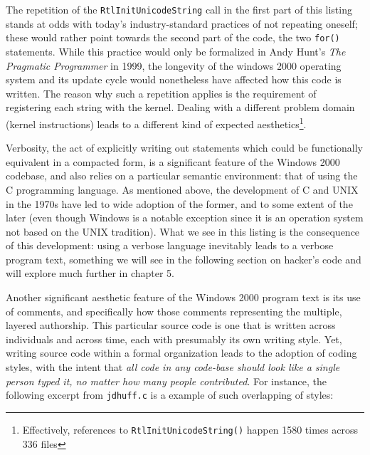 The repetition of the \lstinline{RtlInitUnicodeString} call in the first part of this listing stands at odds with today's industry-standard practices of not repeating oneself; these would rather point towards the second part of the code, the two \lstinline{for()} statements. While this practice would only be formalized in Andy Hunt's \emph{The Pragmatic Programmer} in 1999\cite{hunt_pragmatic_1999}, the longevity of the windows 2000 operating system and its update cycle would nonetheless have affected how this code is written. The reason why such a repetition applies is the requirement of registering each string with the kernel. Dealing with a different problem domain (kernel instructions) leads to a different kind of expected aesthetics\footnote{Effectively, references to \lstinline{RtlInitUnicodeString()} happen 1580 times across 336 files}.

Verbosity, the act of explicitly writing out statements which could be functionally equivalent in a compacted form,  is a significant feature of the Windows 2000 codebase, and also relies on a particular semantic environment: that of using the C programming language. As mentioned above, the development of C and UNIX in the 1970s have led to wide adoption of the former, and to some extent of the later (even though Windows is a notable exception since it is an operation system not based on the UNIX tradition). What we see in this listing is the consequence of this development: using a verbose language inevitably leads to a verbose program text, something we will see in the following section on hacker's code and will explore much further in chapter 5.

Another significant aesthetic feature of the Windows 2000 program text is its use of comments, and specifically how those comments representing the multiple, layered authorship. This particular source code is one that is written across individuals and across time, each with presumably its own writing style. Yet, writing source code within a formal organization leads to the adoption of coding styles, with the intent that \emph{all code in any code-base should look like a single person typed it, no matter how many people contributed}\cite{waldron_idiomaticjsreadmemd_nodate}. For instance, the following excerpt from \lstinline{jdhuff.c} is a example of such overlapping of styles:


